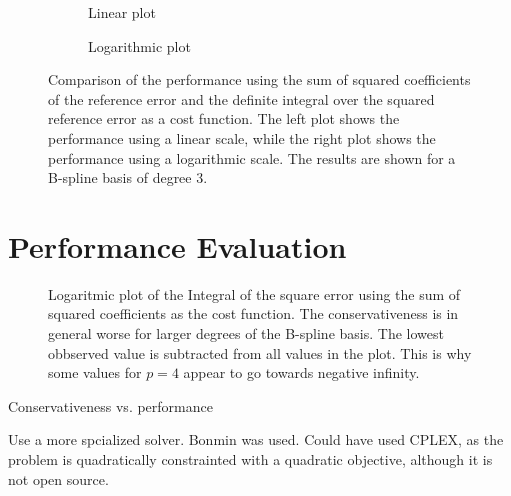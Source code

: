 \begin{figure}
    \centering
    \begin{subfigure}[b]{\textwidth}
        \centering
        
        \caption{Linear plot}
        \label{fig:sq-err-deg-3-linear}
    \end{subfigure}
    \begin{subfigure}[b]{\textwidth}
        \centering
        
        \caption{Logarithmic plot}
        \label{fig:sq-err-deg-3-log}
    \end{subfigure}
    \caption{Comparison of the performance using the sum of squared coefficients of the reference error and the definite integral over the squared reference error as a cost function. The left plot shows the performance using a linear scale, while the right plot shows the performance using a logarithmic scale. The results are shown for a B-spline basis of degree 3.}
    \label{fig:conservativeness}
\end{figure}
\section{Performance Evaluation}
\label{sec:performance-evaluation}

\begin{figure}
    \centering
    
    \caption{Logaritmic plot of the Integral of the square error using the sum of squared coefficients as the cost function. The conservativeness is in general worse for larger degrees of the B-spline basis. The lowest obbserved value is subtracted from all values in the plot. This is why some values for $p=4$ appear to go towards negative infinity.}
    \label{fig:conservativeness-coeffs}
\end{figure}

Conservativeness vs. performance

Use a more spcialized solver. Bonmin was used. Could have used CPLEX, as the problem is quadratically constrainted with a quadratic objective, although it is not open source. 